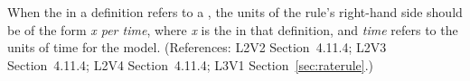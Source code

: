 When the  in a \RateRule definition refers to a
\Compartment, the units of the rule's right-hand side should be of the form
\emph{x per time}, where \emph{x} is the  in that
\Compartment definition, and \emph{time} refers to the units of time for the 
model.  (References: L2V2 Section~4.11.4; L2V3 Section~4.11.4; L2V4 
Section~4.11.4; L3V1 Section~\ref{sec:raterule}.)
